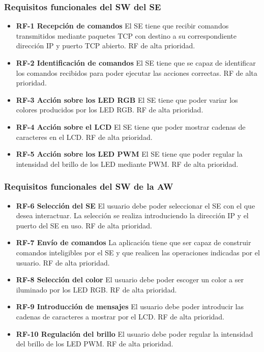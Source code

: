\subsubsection{Requisitos funcionales del SW del SE}
\label{sec:spec-funcionales-se}
\begin{itemize}
  \item \textbf{RF-1 Recepción de comandos} El SE tiene que recibir comandos
  transmitidos mediante paquetes TCP con destino a su correspondiente dirección
  IP y puerto TCP abierto. RF de alta prioridad.
  \item \textbf{RF-2 Identificación de comandos} El SE tiene que se capaz de
  identificar los comandos recibidos para poder ejecutar las acciones correctas.
  RF de alta prioridad.
  \item \textbf{RF-3 Acción sobre los LED RGB} El SE tiene que poder variar
  los colores producidos por los LED RGB. RF de alta prioridad.
  \item \textbf{RF-4 Acción sobre el LCD} El SE tiene que poder mostrar
  cadenas de caracteres en el LCD. RF de alta prioridad.
  \item \textbf{RF-5 Acción sobre los LED PWM} El SE tiene que poder regular
  la intensidad del brillo de los LED mediante PWM. RF de alta prioridad.
\end{itemize}

\subsubsection{Requisitos funcionales del SW de la AW}
\label{sec:spec-funcionales-aw}
\begin{itemize}
  \item \textbf{RF-6 Selección del SE} El usuario debe poder seleccionar el SE 
  con el que desea interactuar. La selección se realiza introduciendo la
  dirección IP y el puerto del SE en uso. RF de alta prioridad.
  \item \textbf{RF-7 Envío de comandos} La aplicación tiene que ser capaz de
  construir comandos inteligibles por el SE y que realicen las operaciones
  indicadas por el usuario. RF de alta prioridad.
  \item \textbf{RF-8 Selección del color} El usuario debe poder escoger un color
  a ser iluminado por los LED RGB. RF de alta prioridad.
  \item \textbf{RF-9 Introducción de mensajes} El usuario debe poder introducir
  las cadenas de caracteres a mostrar por el LCD. RF de alta prioridad.
  \item \textbf{RF-10 Regulación del brillo} El usuario debe poder regular la
  intensidad del brillo de los LED PWM. RF de alta prioridad.
\end{itemize}

